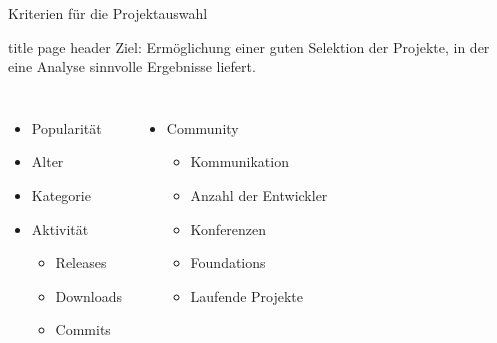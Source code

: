 \documentclass[11pt]{beamer}
\newlength{\colwidth}
\begin{document}
\begin{frame}{Kriterien für die Projektauswahl}
  \begin{beamercolorbox}[sep=1em]{title page header}
    Ziel: Ermöglichung einer guten Selektion der Projekte, in der eine Analyse
    sinnvolle Ergebnisse liefert.
  \end{beamercolorbox}

  \begin{columns}[T]
  \column{\colwidth}
  \begin{itemize}
    \item Popularität
    \item Alter
    \item Kategorie
    \item Aktivität
    \begin{itemize}
      \item Releases
      \item Downloads
      \item Commits
    \end{itemize}
  \end{itemize}
  \column{\colwidth}
  \begin{itemize}
    \item Community
    \begin{itemize}
      \item Kommunikation
      \item Anzahl der Entwickler
      \item Konferenzen
      \item Foundations
      \item Laufende Projekte
    \end{itemize}
  \end{itemize}
  \end{columns}
\end{frame}
\end{document}
